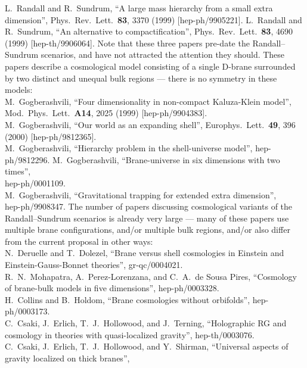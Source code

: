\documentclass[a4paper,12pt]{article}
\begin{document}
\clearpage
\begin{thebibliography}{99}
L.~Randall and R.~Sundrum,
``A large mass hierarchy from a small extra dimension'',
Phys.\ Rev.\ Lett.\  {\bf 83}, 3370 (1999)
[hep-ph/9905221].
L.~Randall and R.~Sundrum,
``An alternative to compactification'',
Phys.\ Rev.\ Lett.\  {\bf 83}, 4690 (1999)
[hep-th/9906064].
Note that these three papers pre-date the Randall--Sundrum scenarios,
and have not attracted the attention they should. These papers
describe a cosmological model consisting of a single D-brane
surrounded by two distinct and unequal bulk regions --- there is no
\coordHE{} symmetry in these models:
\\
M.~Gogberashvili,
``Four dimensionality in non-compact Kaluza-Klein model'',
Mod.\ Phys.\ Lett.\  {\bf A14}, 2025 (1999)
[hep-ph/9904383].
\\
M.~Gogberashvili,
``Our world as an expanding shell'',
Europhys.\ Lett.\  {\bf 49}, 396 (2000)
[hep-ph/9812365].
\\
M.~Gogberashvili,
``Hierarchy problem in the shell-universe model'',
hep-ph/9812296.
M.~Gogberashvili,
``Brane-universe in six dimensions with two times'',\\
hep-ph/0001109.
\\
M.~Gogberashvili,
``Gravitational trapping for extended extra dimension'',\\
hep-ph/9908347.
The number of papers discussing cosmological variants of the
Randall--Sundrum scenarios is already very large --- many of these
papers use multiple brane configurations, and/or multiple bulk
regions, and/or also differ from the current proposal in other ways:
\\
N.~Deruelle and T.~Dolezel,
``Brane versus shell cosmologies in Einstein and Einstein-Gauss-Bonnet theories'',
gr-qc/0004021.
\\
R.~N.~Mohapatra, A.~Perez-Lorenzana, and C.~A.~de Sousa Pires,
``Cosmology of brane-bulk models in five dimensions'',
hep-ph/0003328.
\\
H.~Collins and B.~Holdom,
``Brane cosmologies without orbifolds'',
hep-ph/0003173.
\\
C.~Csaki, J.~Erlich, T.~J.~Hollowood, and J.~Terning,
``Holographic RG and cosmology in theories with quasi-localized gravity'',
hep-th/0003076.
\\
C.~Csaki, J.~Erlich, T.~J.~Hollowood, and Y.~Shirman,
``Universal aspects of gravity localized on thick branes'',

\end{thebibliography}
\end{document}
